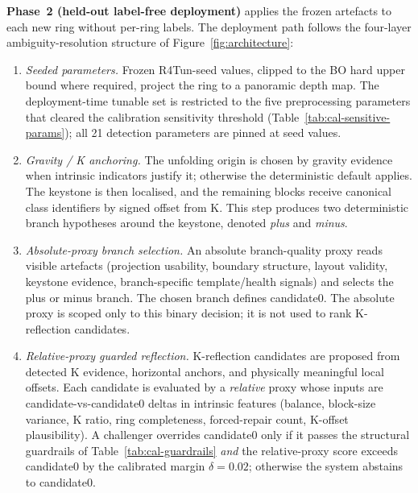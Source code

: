 \documentclass[a4paper,fleqn]{cas-dc}
\begin{document}
\textbf{Phase~2 (held-out label-free deployment)} applies the frozen artefacts to each new ring without per-ring labels. The deployment path follows the four-layer ambiguity-resolution structure of Figure~\ref{fig:architecture}:
\begin{enumerate}
\item \textit{Seeded parameters.} Frozen R4Tun-seed values, clipped to the BO hard upper bound where required, project the ring to a panoramic depth map. The deployment-time tunable set is restricted to the five preprocessing parameters that cleared the calibration sensitivity threshold (Table~\ref{tab:cal-sensitive-params}); all 21 detection parameters are pinned at seed values.
\item \textit{Gravity / K anchoring.} The unfolding origin is chosen by gravity evidence when intrinsic indicators justify it; otherwise the deterministic default applies. The keystone is then localised, and the remaining blocks receive canonical class identifiers by signed offset from K. This step produces two deterministic branch hypotheses around the keystone, denoted \emph{plus} and \emph{minus}.
\item \textit{Absolute-proxy branch selection.} An absolute branch-quality proxy reads visible artefacts (projection usability, boundary structure, layout validity, keystone evidence, branch-specific template/health signals) and selects the plus or minus branch. The chosen branch defines candidate0. The absolute proxy is scoped only to this binary decision; it is not used to rank K-reflection candidates.
\item \textit{Relative-proxy guarded reflection.} K-reflection candidates are proposed from detected K evidence, horizontal anchors, and physically meaningful local offsets. Each candidate is evaluated by a \emph{relative} proxy whose inputs are candidate-vs-candidate0 deltas in intrinsic features (balance, block-size variance, K ratio, ring completeness, forced-repair count, K-offset plausibility). A challenger overrides candidate0 only if it passes the structural guardrails of Table~\ref{tab:cal-guardrails} \emph{and} the relative-proxy score exceeds candidate0 by the calibrated margin $\delta=0.02$; otherwise the system abstains to candidate0.
\end{enumerate}
\end{document}
